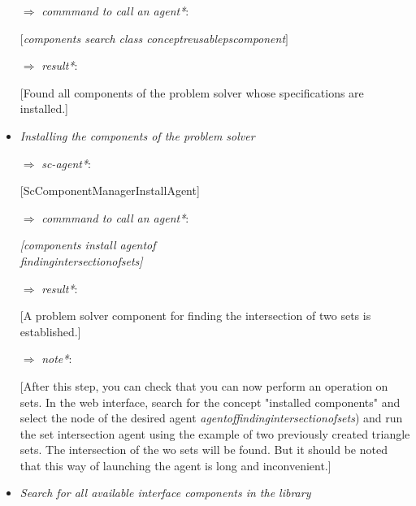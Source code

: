 \documentclass[10pt, a4paper]{article}
\begin{document}
\begin{multicols}{2}
\begin{itemize}
\vspace{-0.2cm}[ScComponentManagerSearchAgent]


\vspace{-0.35cm}\item [ $\Rightarrow$]\textit{commmand to call an agent*}:


\vspace{-0.2cm}\textit{$[$components search \textendash \textendash class concept\textunderscore reusable\textunderscore ps\textunderscore component$]$}
\vspace{-0.35cm}\item [ $\Rightarrow$]\textit{result*}:


[Found all components of the problem solver whose specifications are installed.]
\itemindent 0cm  \vspace{-0.2cm}  \item \textit{Installing the components of the problem solver}
\itemindent 0.3cm \vspace{-0.3cm}\item [ $\Rightarrow$]\textit{sc-agent*}:


\vspace{-0.2cm}[ScComponentManagerInstallAgent]
\vspace{-0.35cm}\item [ $\Rightarrow$]\textit{commmand to call an agent*}:


\vspace{-0.2cm}\textit{[components install \textendash \textendashidtf agent\textunderscore of \\ \textunderscore finding\textunderscore intersection\textunderscore of\textunderscore sets]}
\vspace{-0.2cm}\item [ $\Rightarrow$]\textit{result*}:


[A problem solver component for finding the intersection of two sets is established.]
\vspace{-0.2cm}\item [ $\Rightarrow$]\textit{note*}:


[After this step, you can check that you can now perform an operation on sets. In the web interface, search for the concept "installed components" and select the node of the desired agent
\textit{agent\textunderscore of\textunderscore finding\textunderscore intersection\textunderscore of\textunderscore sets}) and run the set intersection agent using the example of two previously created triangle sets. 
The intersection of the wo sets will be found. But it should be noted that this way of launching the agent is long and inconvenient.]
\vspace{-0.2cm}   \item \textit{Search for all available interface components in the library}
\end{itemize}

\end{multicols}
\end{document}
